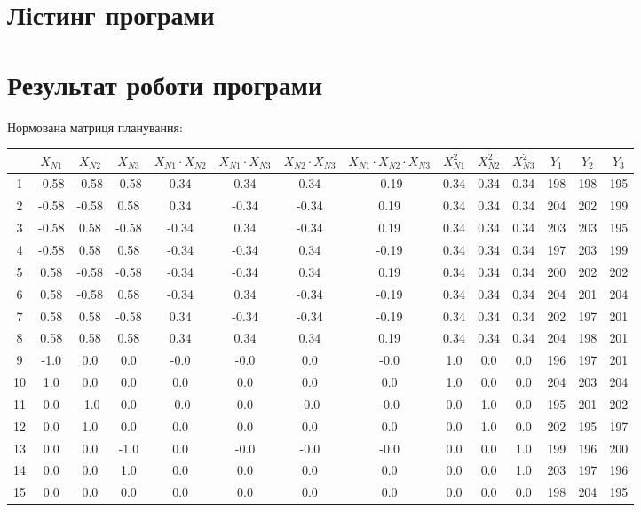 \section{Лістинг програми}



\newpage

\section{Результат роботи програми}

Нормована матриця планування:

\begin{center}
    \tiny
    \begin{tabular}{|c|c|c|c|c|c|c|c|c|c|c|c|c|c|}
        \hline
         & $X_{N1}$ & $X_{N2}$ & $X_{N3}$ & $X_{N1}\cdot X_{N2}$ & $X_{N1}\cdot X_{N3}$ & $X_{N2}\cdot X_{N3}$ &$X_{N1}\cdot X_{N2}\cdot X_{N3}$ & $X^2_{N1}$&$X^2_{N2}$ &$X^2_{N3}$ &$Y_{1}$ & $Y_{2}$ & $Y_{3}$ \\ 
        \hline
        1& -0.58 & -0.58 & -0.58 & 0.34 & 0.34 & 0.34 & -0.19 & 0.34 & 0.34 & 0.34 & 198 & 198 & 195\\
        2& -0.58 & -0.58 & 0.58 & 0.34 & -0.34 & -0.34 & 0.19 & 0.34 & 0.34 & 0.34 & 204 & 202 & 199\\
        3& -0.58 & 0.58 & -0.58 & -0.34 & 0.34 & -0.34 & 0.19 & 0.34 & 0.34 & 0.34 & 203 & 203 & 195\\
        4& -0.58 & 0.58 & 0.58 & -0.34 & -0.34 & 0.34 & -0.19 & 0.34 & 0.34 & 0.34 & 197 & 203 & 199\\
        5& 0.58 & -0.58 & -0.58 & -0.34 & -0.34 & 0.34 & 0.19 & 0.34 & 0.34 & 0.34 & 200 & 202 & 202\\
        6& 0.58 & -0.58 & 0.58 & -0.34 & 0.34 & -0.34 & -0.19 & 0.34 & 0.34 & 0.34 & 204 & 201 & 204\\
        7& 0.58 & 0.58 & -0.58 & 0.34 & -0.34 & -0.34 & -0.19 & 0.34 & 0.34 & 0.34 & 202 & 197 & 201\\
        8& 0.58 & 0.58 & 0.58 & 0.34 & 0.34 & 0.34 & 0.19 & 0.34 & 0.34 & 0.34 & 204 & 198 & 201\\
        9& -1.0 & 0.0 & 0.0 & -0.0 & -0.0 & 0.0 & -0.0 & 1.0 & 0.0 & 0.0 & 196 & 197 & 201\\
        10& 1.0 & 0.0 & 0.0 & 0.0 & 0.0 & 0.0 & 0.0 & 1.0 & 0.0 & 0.0 & 204 & 203 & 204\\
        11& 0.0 & -1.0 & 0.0 & -0.0 & 0.0 & -0.0 & -0.0 & 0.0 & 1.0 & 0.0 & 195 & 201 & 202\\
        12& 0.0 & 1.0 & 0.0 & 0.0 & 0.0 & 0.0 & 0.0 & 0.0 & 1.0 & 0.0 & 202 & 195 & 197\\
        13& 0.0 & 0.0 & -1.0 & 0.0 & -0.0 & -0.0 & -0.0 & 0.0 & 0.0 & 1.0 & 199 & 196 & 200\\
        14& 0.0 & 0.0 & 1.0 & 0.0 & 0.0 & 0.0 & 0.0 & 0.0 & 0.0 & 1.0 & 203 & 197 & 196\\
        15& 0.0 & 0.0 & 0.0 & 0.0 & 0.0 & 0.0 & 0.0 & 0.0 & 0.0 & 0.0 & 198 & 204 & 195\\
        \hline
    \end{tabular}
\end{center}
